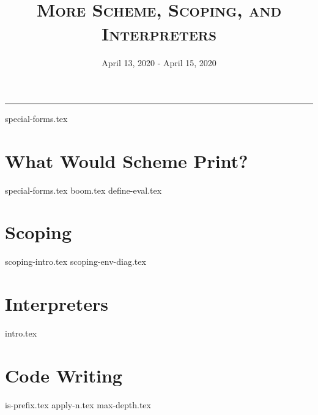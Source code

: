 \documentclass{exam}
\title{\textsc{More Scheme, Scoping, and Interpreters}}
\date{April 13, 2020 - April 15, 2020}
\begin{document}
\maketitle
\rule{\textwidth}{0.15em}
\fontsize{12}{15}\selectfont

{special-forms.tex}
\section{What Would Scheme Print?}
\begin{questions}
{special-forms.tex}
{boom.tex}
{define-eval.tex}
\end{questions}

\section{Scoping}
\begin{questions}
{scoping-intro.tex}
{scoping-env-diag.tex}
\end{questions}

\section{Interpreters}
\begin{questions}
{intro.tex}
\end{questions}

\section{Code Writing}
\begin{questions}
{is-prefix.tex}
{apply-n.tex}
{max-depth.tex}
\end{questions}
\end{document}
